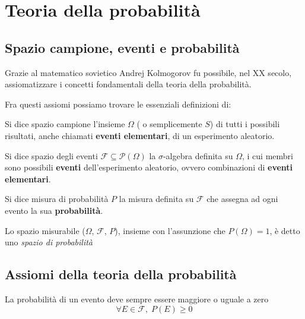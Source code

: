 
\section{Teoria della probabilità}
        \subsection{Spazio campione, eventi e probabilità}
            Grazie al matematico sovietico Andrej Kolmogorov fu possibile, nel XX secolo, assiomatizzare i concetti fondamentali della teoria della probabilità.

            Fra questi assiomi possiamo trovare le essenziali definizioni di:

            \begin{definition}
                Si dice spazio campione l'insieme $\Omega$ ( o semplicemente $S$) di tutti i possibili risultati, anche chiamati \textbf{eventi elementari}, di un esperimento aleatorio.
            \end{definition}

            \begin{definition}
                Si dice spazio degli eventi $\mathcal{F} \subseteq \mathcal{P}(\Omega)$ la $\sigma$-algebra definita su $\Omega$, i cui membri sono possibili \textbf{eventi} dell'esperimento aleatorio, ovvero combinazioni di \textbf{eventi elementari}.
            \end{definition}

            \begin{definition}
                Si dice misura di probabilità $P$ la misura definita su $\mathcal{F}$ che assegna ad ogni evento la sua \textbf{probabilità}.
            \end{definition}

            Lo spazio misurabile ($\Omega$, $\mathcal{F}$, $P$), insieme con l'assunzione che $P(\Omega) = 1$, è detto uno \textit{spazio di probabilità}

        \subsection{Assiomi della teoria della probabilità}
            \begin{axiom}
                La probabilità di un evento deve sempre essere maggiore o uguale a zero
                \[
                    \forall E \in \mathcal{F}, \; P(E) \geq 0
                \]
            \end{axiom}

